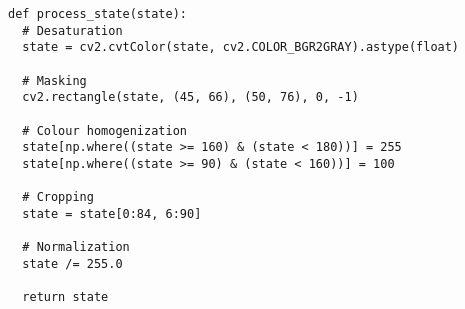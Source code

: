 \begin{lstlisting}[style=codestyle, basicstyle=\ttfamily\footnotesize, caption={Car Racing state image preprocessing}, label=lst:car_racing_image_processing]
def process_state(state):
  # Desaturation
  state = cv2.cvtColor(state, cv2.COLOR_BGR2GRAY).astype(float)

  # Masking
  cv2.rectangle(state, (45, 66), (50, 76), 0, -1)

  # Colour homogenization
  state[np.where((state >= 160) & (state < 180))] = 255
  state[np.where((state >= 90) & (state < 160))] = 100

  # Cropping
  state = state[0:84, 6:90]

  # Normalization
  state /= 255.0

  return state
\end{lstlisting}
